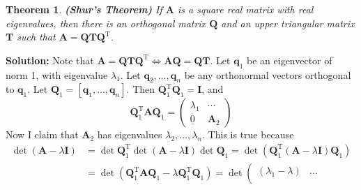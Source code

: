 \documentclass[14pt]{article}
\newtheorem{theorem}{Theorem}[section]
\theoremstyle{definition}
\newenvironment{solution}
{\color{C2}\begin{framed}\begingroup\textbf{Solution:} }
  {\endgroup\end{framed}}
\theoremstyle{remark}
\begin{document}
\begin{theorem}
    \textbf{(Shur's Theorem)}  If $\boldsymbol{A}$ is a square real matrix with real eigenvalues, then there is an orthogonal matrix $\boldsymbol{Q}$ and an upper triangular matrix $\boldsymbol{T}$ such that $\boldsymbol{A}=\boldsymbol{Q} \boldsymbol{T} \boldsymbol{Q}^{\mathrm{T}}$.

\end{theorem}
\begin{solution}
    Note that $\boldsymbol{A}=\boldsymbol{Q} \boldsymbol{T} \boldsymbol{Q}^{\mathrm{T}} \Leftrightarrow \boldsymbol{A} \boldsymbol{Q}=\boldsymbol{Q} \boldsymbol{T}$. Let $\boldsymbol{q}_1$ be an eigenvector of norm 1, with eigenvalue $\lambda_1$. Let $\boldsymbol{q}_2, \ldots, \boldsymbol{q}_n$ be any orthonormal vectors orthogonal to $\boldsymbol{q}_1$. Let $\boldsymbol{Q}_1=\left[\boldsymbol{q}_1, \ldots, \boldsymbol{q}_n\right]$. Then $\boldsymbol{Q}_1^{\mathrm{T}} \boldsymbol{Q}_1=\boldsymbol{I}$, and
    $$
        \boldsymbol{Q}_1^{\mathrm{T}} \boldsymbol{A} \boldsymbol{Q}_1=\left(\begin{array}{cc}
                \lambda_1     & \cdots           \\
                \underline{0} & \boldsymbol{A}_2
            \end{array}\right)
    $$
    Now I claim that $\boldsymbol{A}_2$ has eigenvalues $\lambda_2, \ldots, \lambda_n$. This is true because
    $$
        \begin{aligned}
            \operatorname{\det}(\boldsymbol{A}-\lambda \boldsymbol{I}) & =\operatorname{\det} \boldsymbol{Q}_1^{\mathrm{T}} \operatorname{\det}(\boldsymbol{A}-\lambda \boldsymbol{I}) \operatorname{\det} \boldsymbol{Q}_1=\operatorname{\det}\left(\boldsymbol{Q}_1^{\mathrm{T}}(\boldsymbol{A}-\lambda \boldsymbol{I}) \boldsymbol{Q}_1\right) \\
                                                                       & =\operatorname{\det}\left(\boldsymbol{Q}_1^{\mathrm{T}} \boldsymbol{A} \boldsymbol{Q}_1-\lambda \boldsymbol{Q}_1^{\mathrm{T}} \boldsymbol{Q}_1\right)=\operatorname{\det}\left(\begin{array}{cc}
                                                                                                                                                                                                                                                                \left(\lambda_1-\lambda\right) & \ldots                                               \\

\end{array}
\end{aligned}$$
\end{solution}
\end{document}
